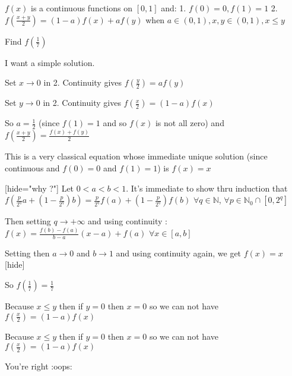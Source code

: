 \begin{solution}
	\begin{tcolorbox}$ f(x)$ is a continuous functions on $ [0,1]$ and:
1. $ f(0) = 0 , f(1) = 1$
2. $ f(\frac {x + y}{2}) = (1 - a)f(x) + af(y)$ when $ a\in (0,1), x,y\in (0,1) , x\leq y$

Find $ f(\frac {1}{7})$

I want a simple solution.\end{tcolorbox}

Set $ x\to 0$ in 2. Continuity gives $ f(\frac y2) = af(y)$

Set $ y\to 0$ in 2. Continuity gives $ f(\frac x2) = (1 - a)f(x)$

So $ a = \frac 12$ (since $ f(1) = 1$ and so $ f(x)$ is not all zero) and $ f(\frac {x + y}2) = \frac {f(x) + f(y)}2$

This is a very classical equation whose immediate unique solution (since continuous and $ f(0) = 0$ and $ f(1) = 1$) is $ f(x) = x$ 

[hide="why ?"]
Let $ 0<a<b<1$. It's immediate to show thru induction that $ f(\frac p{2^q}a+(1-\frac p{2^q})b)=\frac p{2^q}f(a)+(1-\frac p{2^q})f(b)$ $ \forall q\in\mathbb N$, $ \forall p\in\mathbb N_0\cap[0,2^q]$

Then setting $ q\to +\infty$ and using continuity : $ f(x)=\frac{f(b)-f(a)}{b-a}(x-a)+f(a)$ $ \forall x\in[a,b]$

Setting then $ a\to 0$ and $ b\to 1$ and using continuity again, we get $ f(x)=x$
[\/hide]

So $ f(\frac 17) = \frac 17$
\end{solution}



\begin{solution}
	Because $ x\leq y$ then if $ y=0$ then $ x=0$ so we can not have 
$ f(\frac{x}{2}) = (1-a)f(x)$
\end{solution}



\begin{solution}
	\begin{tcolorbox}Because $ x\leq y$ then if $ y = 0$ then $ x = 0$ so we can not have 
$ f(\frac {x}{2}) = (1 - a)f(x)$\end{tcolorbox}

You're right  :oops:
\end{solution}



